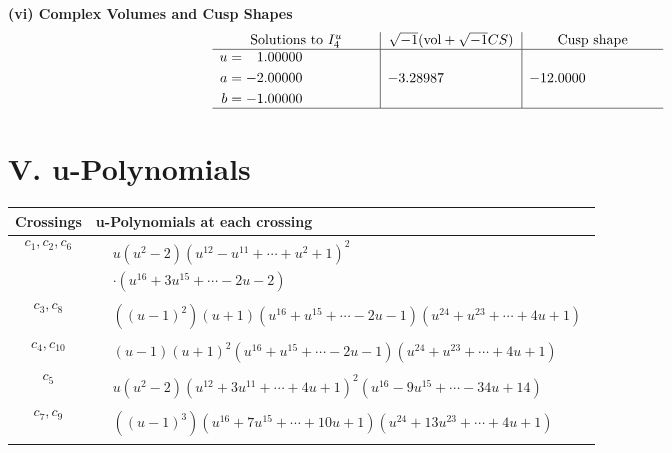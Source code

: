 \documentclass[1p]{elsarticle_modified}
\theoremstyle{definition}
\newcommand{\I}{\sqrt{-1}}
\begin{document}
\newpage\flushleft \textbf{(vi) Complex Volumes and Cusp Shapes}
$$\begin{array}{c|c|c}  
\text{Solutions to }I^u_{4}& \I (\text{vol} + \sqrt{-1}CS) & \text{Cusp shape}\\
 \hline 
\begin{aligned}
u &= \phantom{-}1.00000\phantom{ +0.000000I} \\
a &= -2.00000\phantom{ +0.000000I} \\
b &= -1.00000\phantom{ +0.000000I}\end{aligned}
 & -3.28987\phantom{ +0.000000I} & -12.0000\phantom{ +0.000000I}\\
 \hline 
 \end{array}$$\newpage
\newpage\renewcommand{\arraystretch}{1}
\centering \section*{ V. u-Polynomials}
\begin{tabular}{m{50pt}|m{274pt}}
Crossings & \hspace{64pt}u-Polynomials at each crossing \\
\hline $$\begin{aligned}c_{1},c_{2},c_{6}\end{aligned}$$&$\begin{aligned}
&u(u^2-2)(u^{12}- u^{11}+\cdots+u^2+1)^{2}\\
&\cdot(u^{16}+3 u^{15}+\cdots-2 u-2)
\end{aligned}$\\
\hline $$\begin{aligned}c_{3},c_{8}\end{aligned}$$&$\begin{aligned}
&((u-1)^2)(u+1)(u^{16}+u^{15}+\cdots-2 u-1)(u^{24}+u^{23}+\cdots+4 u+1)
\end{aligned}$\\
\hline $$\begin{aligned}c_{4},c_{10}\end{aligned}$$&$\begin{aligned}
&(u-1)(u+1)^2(u^{16}+u^{15}+\cdots-2 u-1)(u^{24}+u^{23}+\cdots+4 u+1)
\end{aligned}$\\
\hline $$\begin{aligned}c_{5}\end{aligned}$$&$\begin{aligned}
&u(u^2-2)(u^{12}+3 u^{11}+\cdots+4 u+1)^{2}(u^{16}-9 u^{15}+\cdots-34 u+14)
\end{aligned}$\\
\hline $$\begin{aligned}c_{7},c_{9}\end{aligned}$$&$\begin{aligned}
&((u-1)^3)(u^{16}+7 u^{15}+\cdots+10 u+1)(u^{24}+13 u^{23}+\cdots+4 u+1)
\end{aligned}$\\
\hline
\end{tabular}\newpage\renewcommand{\arraystretch}{1}
\end{document}

